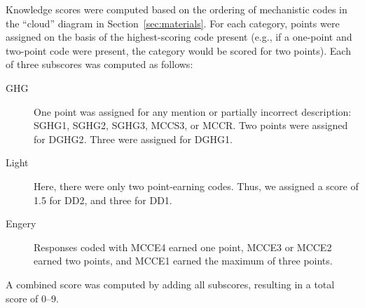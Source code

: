 Knowledge scores were computed based on the ordering of mechanistic codes in the
“cloud” diagram in Section~\ref{sec:materials}. For each category, points were
assigned on the basis of the highest-scoring code present (e.g., if a one-point
and two-point code were present, the category would be scored for two points).
Each of three subscores was computed as follows:
\begin{description}
    \item[GHG] One point was assigned for any mention or partially incorrect
        description: \textsf{SGHG1, SGHG2, SGHG3, MCCS3,} or \textsf{MCCR}. Two
        points were assigned for \textsf{DGHG2}. Three were assigned for
        \textsf{DGHG1}.
    \item[Light] Here, there were only two point-earning codes. Thus, we
        assigned a score of 1.5 for \textsf{DD2}, and three for \textsf{DD1}.
    \item[Engery] Responses coded with \textsf{MCCE4} earned one point,
        \textsf{MCCE3} or \textsf{MCCE2} earned two points, and \textsf{MCCE1}
        earned the maximum of three points.
\end{description}
A combined score was computed by adding all subscores, resulting in a total
score of 0--9.


